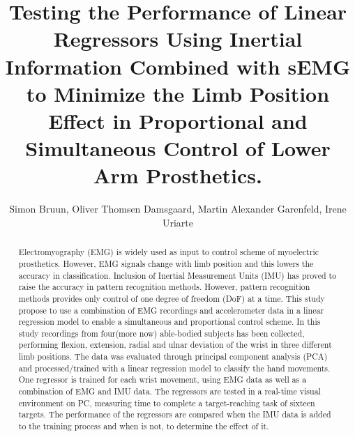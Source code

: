 \documentclass[a4paper, 10pt, conference]{ieeeconf}      %
\title{\LARGE \bf
	Testing the Performance of Linear Regressors Using Inertial Information Combined with sEMG to Minimize the Limb Position Effect in Proportional and Simultaneous Control of Lower Arm Prosthetics.
}%
\author{Simon Bruun, Oliver Thomsen Damsgaard, Martin Alexander Garenfeld, Irene Uriarte}%
\begin{document}
	
	
	
	\maketitle
	\thispagestyle{empty}
	\pagestyle{empty}
	
	
	\begin{abstract}
Electromyography (EMG) is widely used as input to control scheme of myoelectric prosthetics. However, EMG signals change with limb position and this lowers the accuracy in classification. Inclusion of Inertial Measurement Units (IMU) has proved to raise the accuracy in pattern recognition methods. However, pattern recognition methods provides only control of one degree of freedom (DoF) at a time. This study propose to use a combination of EMG recordings and accelerometer data in a linear regression model to enable a simultaneous and proportional control scheme. In this study recordings from four(more now)  able-bodied subjects has been collected, performing flexion, extension, radial and ulnar deviation of the wrist in three different limb positions. The data was evaluated through principal component analysis (PCA) and processed/trained with a linear regression model to classify the hand movements. One regressor is trained for each wrist movement, using EMG data as well as a combination of EMG and IMU data. The regressors are tested in a real-time visual environment on PC, measuring time to complete a target-reaching task of sixteen targets. The performance of the regressors are compared when the IMU data is added to the training process and when is not, to determine the effect of it. 
	
	\end{abstract}
	
	
\end{document}
